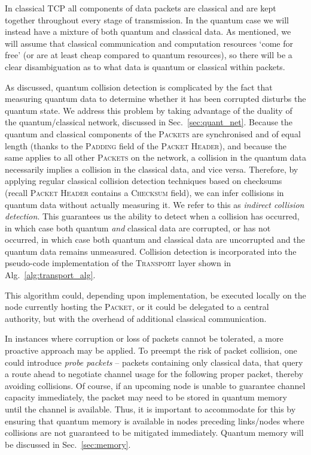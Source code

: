 In classical TCP all components of data packets are classical and are kept together throughout every stage of transmission. In the quantum case we will instead have a mixture of both quantum and classical data. As mentioned, we will assume that classical communication and computation resources `come for free' (or are at least cheap compared to quantum resources), so there will be a clear disambiguation as to what data is quantum or classical within packets.

As discussed, quantum collision detection is complicated by the fact that measuring quantum data to determine whether it has been corrupted disturbs the quantum state. We address this problem by taking advantage of the duality of the quantum/classical network, discussed in Sec.~\ref{sec:quant_net}. Because the quantum and classical components of the \textsc{Packets} are synchronised and of equal length (thanks to the \textsc{Padding} field of the \textsc{Packet Header}), and because the same applies to all other \textsc{Packets} on the network, a collision in the quantum data necessarily implies a collision in the classical data, and vice versa. Therefore, by applying regular classical collision detection techniques based on checksums (recall \textsc{Packet Header} contains a \textsc{Checksum} field), we can infer collisions in quantum data without actually measuring it. We refer to this as \textit{indirect collision detection}. This guarantees us the ability to detect when a collision has occurred, in which case both quantum \textit{and} classical data are corrupted, or has not occurred, in which case both quantum and classical data are uncorrupted and the quantum data remains unmeasured. Collision detection is incorporated into the pseudo-code implementation of the \textsc{Transport} layer shown in Alg.~\ref{alg:transport_alg}.

This algorithm could, depending upon implementation, be executed locally on the node currently hosting the \textsc{Packet}, or it could be delegated to a central authority, but with the overhead of additional classical communication.

In instances where corruption or loss of packets cannot be tolerated, a more proactive approach may be applied. To preempt the risk of packet collision, one could introduce \textit{probe packets} -- packets containing only classical data, that query a route ahead to negotiate channel usage for the following proper packet, thereby avoiding collisions. Of course, if an upcoming node is unable to guarantee channel capacity immediately, the packet may need to be stored in quantum memory until the channel is available. Thus, it is important to accommodate for this by ensuring that quantum memory is available in nodes preceding links/nodes where collisions are not guaranteed to be mitigated immediately. Quantum memory will be discussed in Sec.~\ref{sec:memory}.